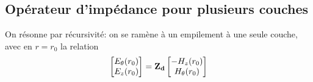 

    \subsection{Opérateur d'impédance pour plusieurs couches}

        \begin{figure}[!hbt]
            \centering
            \begin{tikzpicture}
                
            \end{tikzpicture}
        \end{figure}

        On résonne par récursivité: on se ramène à un empilement à une seule couche, avec en $r=r_0$ la relation
        \begin{equation}
            \begin{bmatrix}
                E_\theta(r_0)\\
                E_z(r_0)\\
            \end{bmatrix}
            =
            \mat {Z_{d}} 
            \begin{bmatrix}
                -H_z(r_0)\\
                H_\theta(r_0)\\
            \end{bmatrix}
        \end{equation}

